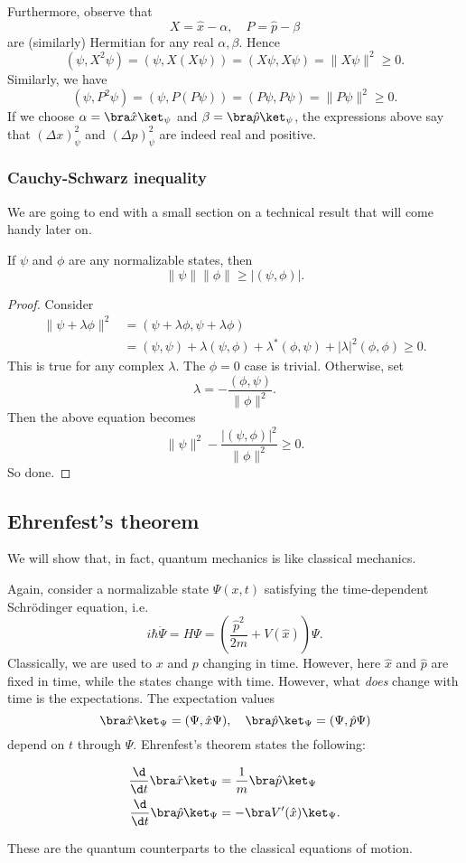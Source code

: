 \documentclass[a4paper]{article}
\begin{document}
Furthermore, observe that
\[
  X = \hat{x} - \alpha,\quad P = \hat{p} - \beta
\]
are (similarly) Hermitian for any real $\alpha, \beta$. Hence
\[
  (\psi, X^2 \psi) = (\psi, X(X\psi)) = (X\psi, X\psi) = \|X\psi\|^2 \geq 0.
\]
Similarly, we have
\[
  (\psi, P^2 \psi) = (\psi, P(P\psi)) = (P\psi, P\psi) = \|P\psi\|^2 \geq 0.
\]
If we choose $\alpha = \bra \hat{x}\ket_\psi$ and $\beta = \bra \hat{p}\ket_\psi$, the expressions above say that $(\Delta x)^2_\psi$ and $(\Delta p)^2_\psi$ are indeed real and positive.
\subsubsection*{Cauchy-Schwarz inequality}
We are going to end with a small section on a technical result that will come handy later on.
\begin{prop}
  If $\psi$ and $\phi$ are any normalizable states, then
  \[
    \|\psi\|\|\phi\| \geq |(\psi, \phi)|.
  \]
\end{prop}

\begin{proof}
  Consider
  \begin{align*}
    \|\psi + \lambda \phi\|^2 &= (\psi + \lambda \phi, \psi + \lambda \phi) \\
    &= (\psi, \psi) + \lambda(\psi, \phi) + \lambda^*(\phi, \psi) + |\lambda|^2 (\phi, \phi) \geq 0.
  \end{align*}
  This is true for any complex $\lambda$. The $\phi = 0$ case is trivial. Otherwise, set
  \[
    \lambda = -\frac{(\phi, \psi)}{\|\phi\|^2}.
  \]
  Then the above equation becomes
  \[
    \|\psi\|^2 - \frac{|(\psi, \phi)|^2}{\|\phi\|^2} \geq 0.
  \]
  So done.
\end{proof}
\subsection{Ehrenfest's theorem}
We will show that, in fact, quantum mechanics is like classical mechanics.

Again, consider a normalizable state $\Psi(x, t)$ satisfying the time-dependent Schr\"odinger equation, i.e.
\[
  i\hbar \dot{\Psi} = H\Psi = \left(\frac{\hat{p}^2}{2m} + V(\hat{x})\right) \Psi.
\]
Classically, we are used to $x$ and $p$ changing in time. However, here $\hat{x}$ and $\hat{p}$ are fixed in time, while the states change with time. However, what \emph{does} change with time is the expectations. The expectation values
\[
  \bra \hat{x}\ket_\Psi = (\Psi, \hat{x}\Psi),\quad \bra \hat{p}\ket_\Psi = (\Psi, \hat{p}\Psi)
\]
depend on $t$ through $\Psi$. Ehrenfest's theorem states the following:
\begin{thm}
  \begin{align*}
    \frac{\d}{\d t}\bra \hat{x}\ket_\Psi &= \frac{1}{m}\bra \hat{p}\ket_\Psi\\
    \frac{\d}{\d t}\bra \hat{p}\ket_\Psi &= -\bra V'(\hat{x})\ket_\Psi.
  \end{align*}
\end{thm}
These are the quantum counterparts to the classical equations of motion.
\end{document}
